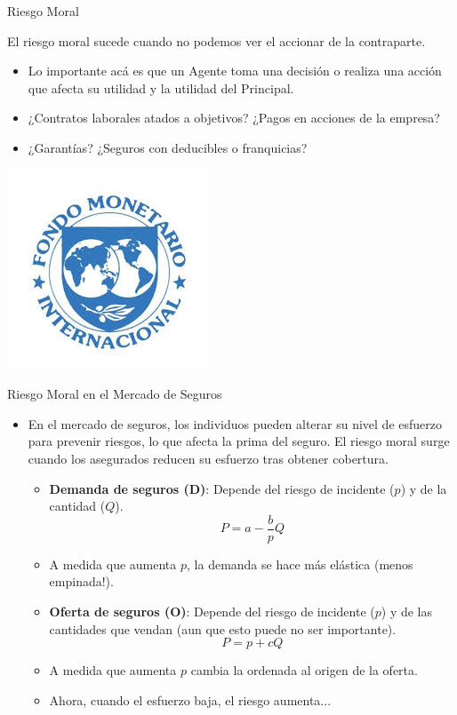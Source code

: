 \documentclass{beamer}
\begin{document}
\begin{frame}{Riesgo Moral}
    \begin{boxA}
        \centering
        El riesgo moral sucede cuando no podemos ver el accionar de la contraparte.
    \end{boxA}
    \begin{itemize}
        \item Lo importante acá es que un Agente toma una decisión o realiza una acción que afecta su
        utilidad y la utilidad del Principal.
        \item ¿Contratos laborales atados a objetivos? ¿Pagos en acciones de la empresa?
        \item ¿Garantías? ¿Seguros con deducibles o franquicias?
    \end{itemize}
    \centering
    \includegraphics[scale=0.4]{../Figures/FMI_Riesgo_Moral.jpg}
\end{frame}

\begin{frame}{Riesgo Moral en el Mercado de Seguros}
    \begin{itemize}
        \item En el mercado de seguros, los individuos pueden alterar su nivel de esfuerzo para prevenir riesgos, lo que afecta la prima del seguro. El riesgo moral surge cuando los asegurados reducen su esfuerzo tras obtener cobertura.
        \begin{itemize}
            \item \textbf{Demanda de seguros (D)}: Depende del riesgo de incidente ($p$) y de la cantidad ($Q$).
            \[P = a - \frac{b}{p} Q \]
            \item A medida que aumenta $p$, la demanda se hace más elástica (menos empinada!).
            \item \textbf{Oferta de seguros (O)}: Depende del riesgo de incidente ($p$) y de las cantidades que vendan (aun que esto puede no ser importante).
            \[P = p + c Q \]
            \item A medida que aumenta $p$ cambia la ordenada al origen de la oferta.
            \item Ahora, cuando el esfuerzo baja, el riesgo aumenta...
        \end{itemize}
    \end{itemize}
\end{frame}
    
\end{document}
